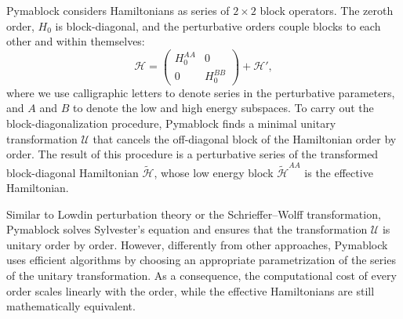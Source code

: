 Pymablock considers Hamiltonians as series of $2\times 2$ block operators.
The zeroth order, $H_0$ is block-diagonal, and the perturbative orders couple
blocks to each other and within themselves:
%
\begin{equation}
\mathcal{H} = \begin{pmatrix}H_0^{AA} & 0 \\ 0 & H_0^{BB}\end{pmatrix} + \mathcal{H}',
\end{equation}
%
where we use calligraphic letters to denote series in the perturbative
parameters, and $A$ and $B$ to denote the low and high energy subspaces.
To carry out the block-diagonalization procedure, Pymablock finds a minimal
unitary transformation $\mathcal{U}$ that cancels the off-diagonal block of the
Hamiltonian order by order.
The result of this procedure is a perturbative series of the transformed
block-diagonal Hamiltonian $\tilde{\mathcal{H}}$, whose low energy block
$\tilde{\mathcal{H}}^{AA}$ is the effective Hamiltonian.

Similar to Lowdin perturbation theory or the Schrieffer--Wolff transformation,
Pymablock solves Sylvester's equation and ensures that the transformation
$\mathcal{U}$ is unitary order by order.
However, differently from other approaches, Pymablock uses efficient algorithms
by choosing an appropriate parametrization of the series of the unitary
transformation.
As a consequence, the computational cost of every order scales linearly with
the order, while the effective Hamiltonians are still mathematically equivalent.
